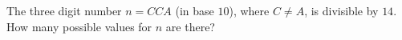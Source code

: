 The three digit number $n=CCA$ (in base $10$), where $C\neq A$, is divisible by $14$. How many possible values for $n$ are there?